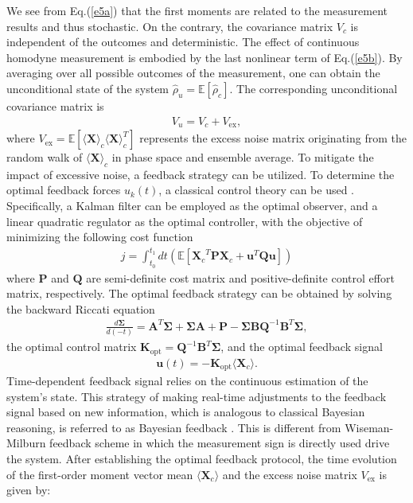 \documentclass[
aps,
reprint,
superscriptaddress,
amsmath,amssymb,
pra
]{revtex4-2}
\begin{document}
We see from Eq.(\ref{e5a}) that the first moments are related to the measurement results and thus stochastic. On the contrary, the covariance matrix $V_c$ is independent of the outcomes and deterministic. The effect of continuous homodyne measurement is embodied by the last nonlinear term of Eq.(\ref{e5b}). By averaging over all possible outcomes of the measurement, one can obtain the unconditional state of the system $\hat \rho_u =\mathbb{E}[\hat \rho_c]$. The corresponding unconditional covariance matrix is
 \begin{align}
{{V }_{u}}={{V }_{c}}+{{V }_{\text{ex}}},
 \end{align}
where ${V }_{\text{ex}}=\mathbb{E}[\langle \mathbf{X}\rangle_c \langle \mathbf{X}\rangle_c^T]$ represents the excess noise matrix originating from the random walk of $\langle \textbf{X}\rangle_c$ in phase space and ensemble average. To mitigate the impact of excessive noise, a feedback strategy can be utilized. To determine the optimal feedback forces $u_k(t)$, a classical control theory can be used \cite{PhysRevA.60.2700}. Specifically, a Kalman filter can be employed as the optimal observer, and  a linear quadratic regulator as the optimal controller, with the objective of minimizing the following cost function
\begin{align}
j = \int_{{t_0}}^{t_1 }{dt\left( \mathbb{E} \left[ {{\mathbf{X} }_{c}}^{T}\mathbf{P}{{\mathbf{X}  }_{c}}+\mathbf{u} ^{T}\mathbf{Q}\mathbf{u} \right] \right)}
\end{align}
where $\mathbf{P}$ and $\mathbf{Q}$ are semi-definite cost matrix and positive-definite control effort matrix, respectively. The optimal feedback strategy can be obtained by solving the backward Riccati equation
\begin{align}
\frac{d\mathbf \Sigma}{d\left( -t \right)}={\mathbf{A}^{T}} \mathbf \Sigma+ \mathbf \Sigma\mathbf A+\mathbf{P}-\mathbf \Sigma \mathbf B{{\mathbf{Q}}^{-1}}{\mathbf{B}^{T}}\mathbf \Sigma,
\end{align}
the optimal control matrix $\mathbf K_\text{opt} = \mathbf Q^{-1}\mathbf B^T \mathbf \Sigma$, and the optimal feedback signal 
\begin{align}
\mathbf u(t) = - \mathbf K_\text{opt} \langle \mathbf{X}_c\rangle. 
\end{align}
Time-dependent feedback signal relies on the continuous estimation of the system's state. This strategy of making real-time adjustments to the feedback signal based on new information, which is analogous to classical Bayesian reasoning, is referred to as Bayesian feedback \cite{PhysRevA.66.013807}.  This is different from  Wiseman-Milburn feedback scheme \cite{wiseman2009quantum} in which the measurement sign is directly used drive the system. After establishing the optimal feedback protocol, the time evolution of the first-order moment vector mean $\langle\mathbf{X}_c\rangle$ and the excess noise matrix $V_\mathrm{ex}$ is given by:
\end{document}

